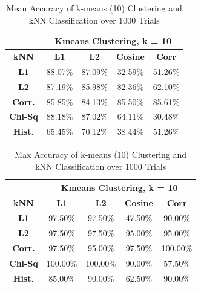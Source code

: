 \documentclass[10pt,twocolumn,letterpaper]{article}
\begin{document}
\begin{table}[H]
\caption{Mean Accuracy of k-means (10) Clustering and kNN Classification over 1000 Trials \label{tab:kmeans10}}
\small
\begin{center}
\begin{tabular}{|c| c c c c|}
\cline{2-5}
\multicolumn{1}{c|}{ } & \multicolumn{4}{|c|}{\bf Kmeans Clustering, k = 10} \\
\hline

\bf kNN &\bf L1 &\bf L2 &\bf Cosine &\bf Corr \\ [0.5ex]
\hline
\bf L1 & 88.07\% & 87.09\%  & 32.59\% & 51.26\%\\ [0.5ex]
\hline
\bf L2 & 87.19\% & 85.98\%  & 82.36\% & 62.10\%\\ [0.5ex]
\hline
\bf Corr. & 85.85\% & 84.13\%  & 85.50\% & 85.61\%\\ [0.5ex]
\hline
\bf Chi-Sq & 88.18\% & 87.02\%  & 64.11\% & 30.48\%\\ [0.5ex]
\hline
\bf Hist. & 65.45\% & 70.12\%  & 38.44\% & 51.26\%\\ [0.5ex]
\hline
\end{tabular}
\end{center}
\end{table}

\begin{table}[H]
\caption{Max Accuracy of k-means (10) Clustering and kNN Classification over 1000 Trials \label{tab:kmeans_max10}}
\small
\begin{center}
\begin{tabular}{|c| c c c c|}
\cline{2-5}
\multicolumn{1}{c|}{ } & \multicolumn{4}{|c|}{\bf Kmeans Clustering, k = 10} \\
\hline

\bf kNN &\bf L1 &\bf L2 &\bf Cosine &\bf Corr \\ [0.5ex]
\hline
\bf L1 & 97.50\% & 97.50\%  & 47.50\% & 90.00\%\\ [0.5ex]
\hline
\bf L2 & 97.50\% & 97.50\%  & 95.00\% & 95.00\%\\ [0.5ex]
\hline
\bf Corr. & 97.50\% & 95.00\%  & 97.50\% & 100.00\%\\ [0.5ex]
\hline
\bf Chi-Sq & 100.00\% & 100.00\%  & 90.00\% & 57.50\%\\ [0.5ex]
\hline
\bf Hist. & 85.00\% & 90.00\%  & 62.50\% & 90.00\%\\ [0.5ex]
\hline
\end{tabular}
\end{center}
\end{table}
\end{document}
